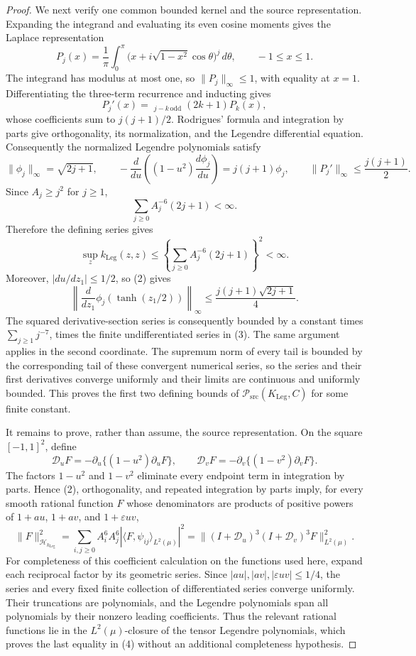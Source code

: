 \documentclass{article}
\begin{document}
\begin{proof}
We next verify one common bounded kernel and the source representation.  Expanding the integrand and evaluating its even cosine moments gives the Laplace representation
\[
 P_j(x)=\frac1\pi\int_0^\pi
 \bigl(x+i\sqrt{1-x^2}\cos\theta\bigr)^j\,d\theta,
 \qquad -1\le x\le1.
\]
The integrand has modulus at most one, so \(\|P_j\|_\infty\le1\), with equality at \(x=1\).  Differentiating the three-term recurrence and inducting gives
\[
 P_j'(x)=\mathop{\sum_{0\le k<j}}_{j-k\,\mathrm{odd}}(2k+1)P_k(x),
\]
whose coefficients sum to \(j(j+1)/2\).  Rodrigues' formula and integration by parts give orthogonality, its normalization, and the Legendre differential equation.  Consequently the normalized Legendre polynomials satisfy
\[
 \|\phi_j\|_{\infty}=\sqrt{2j+1},
 \qquad
 -\frac{d}{du}\!\left((1-u^2)\frac{d\phi_j}{du}\right)
 =j(j+1)\phi_j,
 \qquad
 \|P_j'\|_\infty\le\frac{j(j+1)}2.
 \tag{2}
\]
Since \(A_j\ge j^2\) for \(j\ge1\),
\[
 \sum_{j\ge0}A_j^{-6}(2j+1)<\infty.
\]
Therefore the defining series gives
\[
 \sup_z k_{\mathrm{Leg}}(z,z)
 \le\left\{\sum_{j\ge0}A_j^{-6}(2j+1)\right\}^2<\infty.
 \tag{3}
\]
Moreover, \(|du/dz_1|\le1/2\), so (2) gives
\[
 \left\|\frac{d}{dz_1}\phi_j(\tanh(z_1/2))\right\|_{\infty}
 \le\frac{j(j+1)\sqrt{2j+1}}4.
\]
The squared derivative-section series is consequently bounded by a constant times \(\sum_{j\ge1}j^{-7}\), times the finite undifferentiated series in (3).  The same argument applies in the second coordinate.  The supremum norm of every tail is bounded by the corresponding tail of these convergent numerical series, so the series and their first derivatives converge uniformly and their limits are continuous and uniformly bounded.  This proves the first two defining bounds of \(\mathcal P_{\mathrm{src}}(K_{\mathrm{Leg}},C)\) for some finite constant.

It remains to prove, rather than assume, the source representation.  On the square \([-1,1]^2\), define
\[
 \mathscr D_uF=-\partial_u\{(1-u^2)\partial_uF\},
 \qquad
 \mathscr D_vF=-\partial_v\{(1-v^2)\partial_vF\}.
\]
The factors \(1-u^2\) and \(1-v^2\) eliminate every endpoint term in integration by parts.  Hence (2), orthogonality, and repeated integration by parts imply, for every smooth rational function \(F\) whose denominators are products of positive powers of \(1+au\), \(1+av\), and \(1+\varepsilon uv\),
\[
 \|F\|_{\mathcal H_{k_{\mathrm{Leg}}}}^2
 =\sum_{i,j\ge0}A_i^6A_j^6|\langle F,\psi_{ij}\rangle_{L^2(\mu)}|^2
 =\|(I+\mathscr D_u)^3(I+\mathscr D_v)^3F\|_{L^2(\mu)}^2.
 \tag{4}
\]
For completeness of this coefficient calculation on the functions used here, expand each reciprocal factor by its geometric series.  Since \(|au|,|av|,|\varepsilon uv|\le1/4\), the series and every fixed finite collection of differentiated series converge uniformly.  Their truncations are polynomials, and the Legendre polynomials span all polynomials by their nonzero leading coefficients.  Thus the relevant rational functions lie in the \(L^2(\mu)\)-closure of the tensor Legendre polynomials, which proves the last equality in (4) without an additional completeness hypothesis.


\end{proof}
\end{document}
